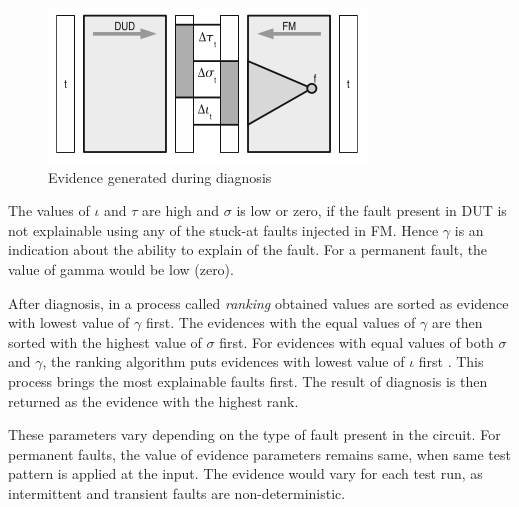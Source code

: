 \begin{figure}[h]
  \begin{center}
    \captionsetup{justification=centering}
    \includegraphics[scale=1.00]{figures/evidance.png}
    \caption{Evidence generated during diagnosis \cite{Holst2009}}
    \label{fig:evidance}
  \end{center}
\end{figure}

The values of $\iota$ and $\tau$ are high and $\sigma$ is low or zero, if the fault present in DUT is not explainable using any of the stuck-at faults injected in FM. Hence $\gamma$ is an indication about the ability to explain of the fault. For a permanent fault, the value of gamma would be low (zero). 

After diagnosis, in a process called \emph{ranking} obtained values are sorted as evidence with lowest value of $\gamma$ first. The evidences with the equal values of $\gamma$ are then sorted with the highest value of $\sigma$ first. For evidences with equal values of both $\sigma$ and $\gamma$, the ranking algorithm puts evidences with lowest value of $\iota$ first \cite{Holst2009}. This process brings the most explainable faults first. The result of diagnosis is then returned as the evidence with the highest rank.

These parameters vary depending on the type of fault present in the circuit. For permanent faults, the value of evidence parameters remains same, when same test pattern is applied at the input. The evidence would vary for each test run, as intermittent and transient faults are non-deterministic.



